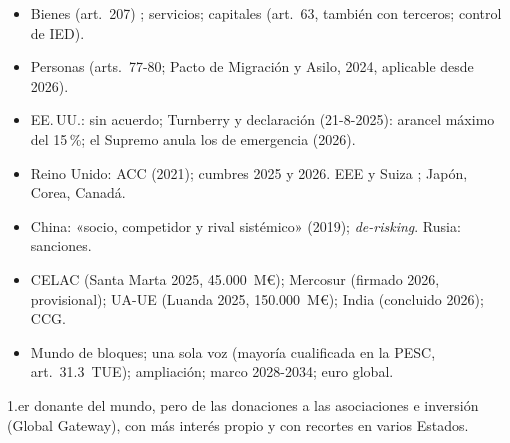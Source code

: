 \documentclass{article}
\begin{document}
\begin{columnas}
\begin{itemize}
\item Bienes (art.~207) ; servicios; capitales (art.~63, también con terceros; control de IED).
\item Personas (arts.~77-80; Pacto de Migración y Asilo, 2024, aplicable desde 2026).
\end{itemize}
\begin{itemize}
\item EE.\,UU.: sin acuerdo; Turnberry y declaración (21-8-2025): arancel máximo del 15\,\%; el Supremo anula los de emergencia (2026).
\item Reino Unido: ACC (2021); cumbres 2025 y 2026. EEE y Suiza ; Japón, Corea, Canadá.
\end{itemize}
\begin{itemize}
\item China: «socio, competidor y rival sistémico» (2019); \emph{de-risking}. Rusia: sanciones.
\item CELAC (Santa Marta 2025, 45.000~M€); Mercosur (firmado 2026, provisional); UA-UE (Luanda 2025, 150.000~M€); India (concluido 2026); CCG.
\end{itemize}
\begin{itemize}
\item Mundo de bloques; una sola voz (mayoría cualificada en la PESC, art.~31.3~TUE); ampliación; marco 2028-2034; euro global.
\end{itemize}

\begin{ideaclave}
1.er donante del mundo, pero de las donaciones a las asociaciones e inversión (Global Gateway), con más interés propio y con recortes en varios Estados.
\end{ideaclave}


\end{columnas}
\end{document}
